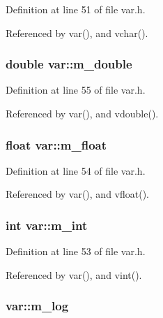 Definition at line 51 of file var.h.

Referenced by var(), and vchar().\hypertarget{classvar_ad8590162a1dae61824b874c615cce311}{
\subsubsection[{m\_\-double}]{\setlength{\rightskip}{0pt plus 5cm}double {\bf var::m\_\-double}}}
\label{classvar_ad8590162a1dae61824b874c615cce311}


Definition at line 55 of file var.h.

Referenced by var(), and vdouble().\hypertarget{classvar_adb803c54ed2edb812a77241d511385e6}{
\subsubsection[{m\_\-float}]{\setlength{\rightskip}{0pt plus 5cm}float {\bf var::m\_\-float}}}
\label{classvar_adb803c54ed2edb812a77241d511385e6}


Definition at line 54 of file var.h.

Referenced by var(), and vfloat().\hypertarget{classvar_a2796c70baa395a5e2c5457df760249d7}{
\subsubsection[{m\_\-int}]{\setlength{\rightskip}{0pt plus 5cm}int {\bf var::m\_\-int}}}
\label{classvar_a2796c70baa395a5e2c5457df760249d7}


Definition at line 53 of file var.h.

Referenced by var(), and vint().\hypertarget{classvar_a5dfdc5180270038b686ad3013874a026}{
\subsubsection[{m\_\-log}]{ {\bf var::m\_\-log}}}
\label{classvar_a5dfdc5180270038b686ad3013874a026}


